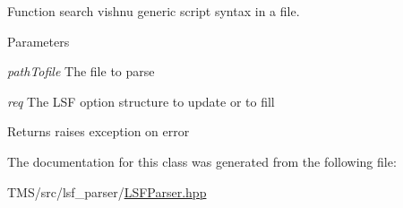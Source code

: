 Function search vishnu generic script syntax in a file. 


\begin{DoxyParams}{Parameters}
\item[{\em pathTofile}]The file to parse \item[{\em req}]The LSF option structure to update or to fill \end{DoxyParams}
\begin{DoxyReturn}{Returns}
raises exception on error 
\end{DoxyReturn}


The documentation for this class was generated from the following file:\begin{DoxyCompactItemize}
\item 
TMS/src/lsf\_\-parser/\hyperlink{LSFParser_8hpp}{LSFParser.hpp}\end{DoxyCompactItemize}
